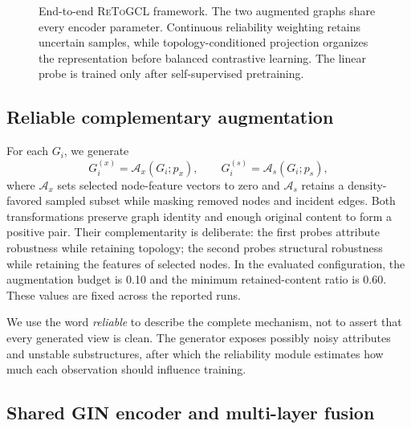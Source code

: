 \documentclass[10pt,twocolumn]{article}
\newcommand{\method}{\textsc{ReToGCL}}
\begin{document}
\begin{figure}[t]
{
}
\caption{End-to-end \method{} framework. The two augmented graphs share every encoder parameter. Continuous reliability weighting retains uncertain samples, while topology-conditioned projection organizes the representation before balanced contrastive learning. The linear probe is trained only after self-supervised pretraining.}
\label{fig:framework}
\end{figure}

\subsection{Reliable complementary augmentation}

For each $G_i$, we generate
\begin{equation}
G_i^{(x)}=\mathcal A_x(G_i;p_x),\qquad
G_i^{(s)}=\mathcal A_s(G_i;p_s),
\end{equation}
where $\mathcal A_x$ sets selected node-feature vectors to zero and $\mathcal A_s$ retains a density-favored sampled subset while masking removed nodes and incident edges. Both transformations preserve graph identity and enough original content to form a positive pair. Their complementarity is deliberate: the first probes attribute robustness while retaining topology; the second probes structural robustness while retaining the features of selected nodes. In the evaluated configuration, the augmentation budget is 0.10 and the minimum retained-content ratio is 0.60. These values are fixed across the reported runs.

We use the word \emph{reliable} to describe the complete mechanism, not to assert that every generated view is clean. The generator exposes possibly noisy attributes and unstable substructures, after which the reliability module estimates how much each observation should influence training.

\subsection{Shared GIN encoder and multi-layer fusion}
\end{document}
